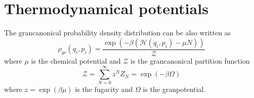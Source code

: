\section{Thermodynamical potentials} 

    The grancanonical probability density distribution can be also written as 
    \begin{equation*}
        \rho_{gc} (q_i, p_i) = \frac{\exp(-\beta (\mathcal H (q_i, p_i) - \mu N))}{\mathcal Z}
    \end{equation*}
    where $\mu$ is the chemical potential and $\mathcal Z$ is the grancanonical partition function
    \begin{equation*}
        \mathcal Z = \sum_{N = 0}^{\infty} z^N Z_N = \exp(-\beta \Omega) 
    \end{equation*}
    where $z = \exp(\beta \mu)$ is the fugacity and $\Omega$ is the granpotential. 

